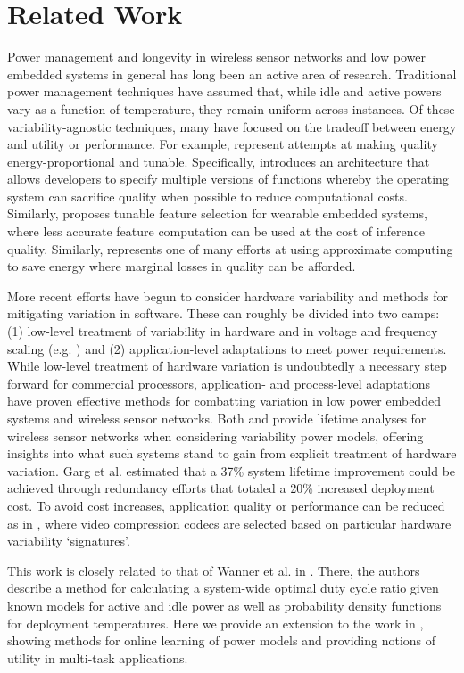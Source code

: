 \section{Related Work}

Power management and longevity in wireless sensor networks and low power embedded systems in general has long been an active area of research.  Traditional power management techniques have assumed that, while idle and active powers vary as a function of temperature, they remain uniform across instances.  Of these variability-agnostic techniques, many have focused on the tradeoff between energy and utility or performance.  For example, \cite{green2010, ghasemzadeh2012} represent attempts at making quality energy-proportional and tunable.  Specifically, \cite{green2010} introduces an architecture that allows developers to specify multiple versions of functions whereby the operating system can sacrifice quality when possible to reduce computational costs.  Similarly, \cite{ghasemzadeh2012} proposes tunable feature selection for wearable embedded systems, where less accurate feature computation can be used at the cost of inference quality. Similarly, \cite{liu1994} represents one of many efforts at using approximate computing to save energy where marginal losses in quality can be afforded. 

More recent efforts have begun to consider hardware variability and methods for mitigating variation in software.  These can roughly be divided into two camps: (1) low-level treatment of variability in hardware and in voltage and frequency scaling (e.g. \cite{teodorescu2008}) and (2) application-level adaptations to meet power requirements.  While low-level treatment of hardware variation is undoubtedly a necessary step forward for commercial processors, application- and process-level adaptations have proven effective methods for combatting variation in low power embedded systems and wireless sensor networks.  Both \cite{matsuda2006} and \cite{garg2007} provide lifetime analyses for wireless sensor networks when considering variability power models, offering insights into what such systems stand to gain from explicit treatment of hardware variation.  Garg et al. estimated that a 37\% system lifetime improvement could be achieved through redundancy efforts that totaled a 20\% increased deployment cost.  To avoid cost increases, application quality or performance can be reduced as in \cite{pant2010}, where video compression codecs are selected based on particular hardware variability `signatures'.

This work is closely related to that of Wanner et al. in \cite{wanner2011}.  There, the authors describe a method for calculating a system-wide optimal duty cycle ratio given known models for active and idle power as well as probability density functions for deployment temperatures. Here we provide an extension to the work in \cite{wanner2011}, showing methods for online learning of power models and providing notions of utility in multi-task applications.  


